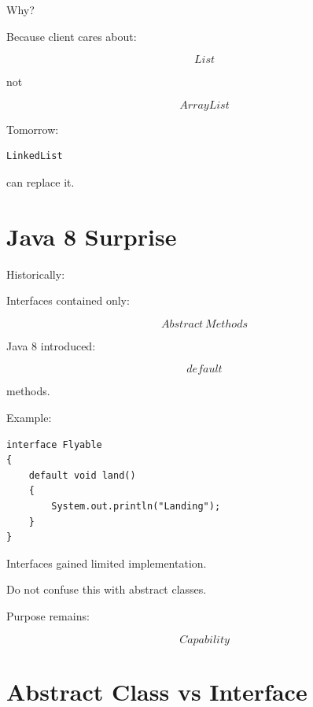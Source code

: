 \documentclass[11pt,a4paper]{book}
\begin{document}
Why?

Because client cares about:

\[
List
\]

not

\[
ArrayList
\]


Tomorrow:

\begin{verbatim}
LinkedList
\end{verbatim}

can replace it.


\section{Java 8 Surprise}

Historically:

Interfaces contained only:

\[
Abstract\ Methods
\]


Java 8 introduced:

\[
default
\]

methods.


Example:

\begin{verbatim}
interface Flyable
{
    default void land()
    {
        System.out.println("Landing");
    }
}
\end{verbatim}


Interfaces gained limited implementation.


Do not confuse this with abstract classes.


Purpose remains:

\[
Capability
\]


\section{Abstract Class vs Interface}
\end{document}
